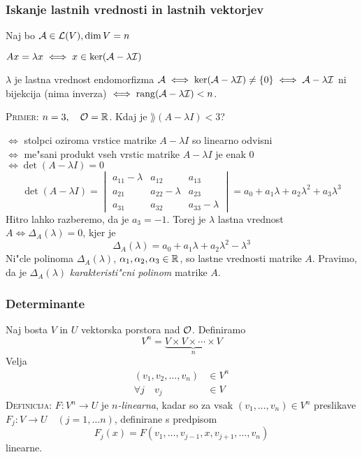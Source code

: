 \subsubsection{Iskanje lastnih vrednosti in lastnih vektorjev}
Naj bo $\mathcal{A} \in \mathcal{L}(V), \dim V = n$

$Ax = \lambda x \iff x \in \ker (\mathcal{A} - \lambda \mathcal{I})$

$\lambda$ je lastna vrednost endomorfizma $\mathcal{A} \iff \ker (\mathcal{A} - \lambda \mathcal{I}) \neq \{0\} \iff \mathcal{A} - \lambda \mathcal{I}$ ni bijekcija (nima inverza) $\iff \operatorname{rang}(\mathcal{A} - \lambda \mathcal{I}) < n$.

\textsc{Primer:} $n = 3, \quad \mathcal{O} = \mathbb{R}$. Kdaj je $\rang(A - \lambda I) < 3$?

$\iff$ stolpci oziroma vrstice matrike $A - \lambda I$ so linearno odvisni \\
$\iff$ me"sani produkt vseh vrstic matrike $A - \lambda I$ je enak 0 \\
$\iff \det(A - \lambda I) = 0$
\begin{equation*}
\det(A - \lambda I) = 
\begin{vmatrix}
a_{11} - \lambda & a_{12} & a_{13} \\
a_{21} & a_{22} - \lambda & a_{23} \\
a_{31} & a_{32} & a_{33} - \lambda
\end{vmatrix}
= a_0 + a_1 \lambda + a_2 \lambda^2 + a_3 \lambda^3
\end{equation*}
Hitro lahko razberemo, da je $a_3 = -1$. Torej je $\lambda$ lastna vrednost $A \iff \Delta_A(\lambda) = 0$, kjer je
\begin{equation*}
\Delta_A(\lambda) = a_0 + a_1 \lambda + a_2 \lambda^2 - \lambda^3
\end{equation*}
Ni"cle polinoma $\Delta_A(\lambda)$, $\alpha_1, \alpha_2, \alpha_3 \in \mathbb{R}$, so lastne vrednosti matrike $A$. Pravimo, da je $\Delta_A(\lambda)$ \emph{karakteristi"cni polinom} matrike $A$.
%
\subsubsection{Determinante}
Naj bosta $V$ in $U$ vektorska porstora nad $\mathcal{O}$. Definiramo
\begin{equation*}
V^n = \underbrace{V \times V \times \cdots \times V}_n
\end{equation*}
Velja
\begin{align*}
(v_1, v_2, \ldots, v_n) &\in V^n \\
\forall j \quad v_j &\in V
\end{align*}
%
\textsc{Definicija:} $F: V^n \to U$ je \emph{$n$-linearna}, kadar so za vsak $(v_1, \ldots, v_n) \in V^n$ preslikave $F_j: V \to U \quad (j = 1, \ldots n)$, definirane s predpisom
\begin{equation*}
F_j(x) = F(v_1, \ldots, v_{j-1}, x, v_{j+1}, \ldots, v_n)
\end{equation*}
linearne.

